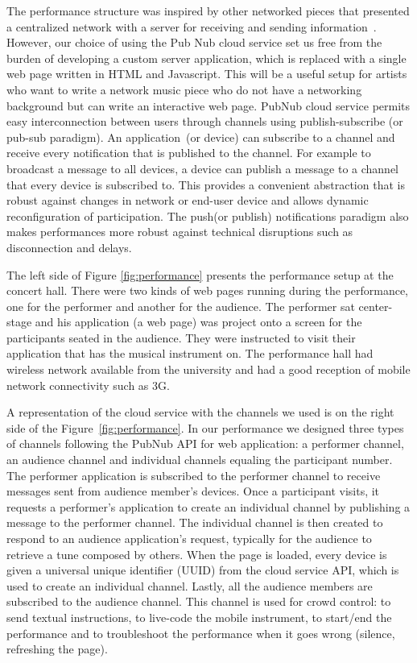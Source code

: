 The performance structure was inspired by other networked pieces that presented a centralized network with a server for receiving and sending information~\citep{Weinberg2005interconnected}.
However, our choice of using the Pub Nub cloud service set us free from the burden of developing a custom server application, which is replaced with a single web page written in HTML and Javascript.
This will be a useful setup for artists who want to write a network music piece who do not have a networking background but can write an interactive web page.
PubNub cloud service permits easy interconnection between users through channels using publish-subscribe (or pub-sub paradigm).
An application~(or device) can subscribe to a channel and receive every notification that is published to the channel. 
For example to broadcast a message to all devices, a device can publish a message to a channel that every device is subscribed to. 
This provides a convenient abstraction that is robust against changes in network or end-user device and allows dynamic reconfiguration of participation.
The push(or publish) notifications paradigm also makes performances more robust against technical disruptions such as disconnection and delays.

The left side of Figure \ref{fig:performance} presents the performance setup at the concert hall.
There were two kinds of web pages running during the performance, one for the performer and another for the audience.
The performer sat center-stage and his application (a web page) was project onto a screen for the participants seated in the audience.
They were instructed to visit their application that has the musical instrument on.
The performance hall had wireless network available from the university and had a good reception of mobile network connectivity such as 3G.

A representation of the cloud service with the channels we used is on the right side of the Figure~\ref{fig:performance}.
In our performance we designed three types of channels following the PubNub API for web application: a performer channel, an audience channel and individual channels equaling the participant number. 
The performer application is subscribed to the performer channel to receive messages sent from audience member's devices. 
Once a participant visits, it requests a performer's application to create an individual channel by publishing a message to the performer channel.
The individual channel is then created to respond to an audience application's request, typically for the audience to retrieve a tune composed by others.
When the page is loaded, every device is given a universal unique identifier (UUID) from the cloud service API, which is used to create an individual channel.
Lastly, all the audience members are subscribed to the audience channel. 
This channel is used for crowd control: to send textual instructions, to live-code the mobile instrument, to start/end the performance and to troubleshoot the performance when it goes wrong (silence, refreshing the page).

